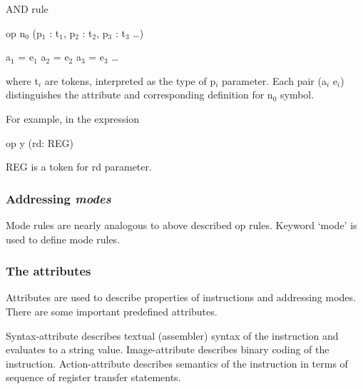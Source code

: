 \documentclass[oneside,final,12pt]{extreport}
\begin{document}
\bfseries

AND rule 

\mdseries

\upshape

\bigskip

op n$_0$ (p$_1$ : t$_1$, p$_2$ : t$_2$, p$_3$ : t$_3$ …)

\bigskip

a$_1$ = e$_1$ a$_2$ = e$_2$ a$_3$ = e$_3$ …

\bigskip


where t$_i$ are tokens, interpreted as the type of p$_i$ parameter.
Each pair (a$_i$ e$_i$) distinguishes the attribute and corresponding definition for n$_0$ symbol.

\bigskip

For example, in the expression

\bigskip

op y (rd: REG)


\bigskip

REG is a token for rd parameter. 

\bigskip
\bigskip


\subsubsection*{Addressing \itshape{modes}}

\bigskip

Mode rules are nearly analogous to above described op rules. Keyword ‘mode’ is used to define mode rules.

\bigskip
\bigskip


\subsubsection*{The attributes}

\bigskip

Attributes are used to describe properties of instructions and addressing modes. There are some important predefined attributes.

\bigskip

Syntax-attribute describes textual (assembler) syntax of the instruction and evaluates to a string value. Image-attribute describes binary coding of the instruction. Action-attribute describes semantics of the instruction in terms of sequence of register transfer statements. 
\end{document}
